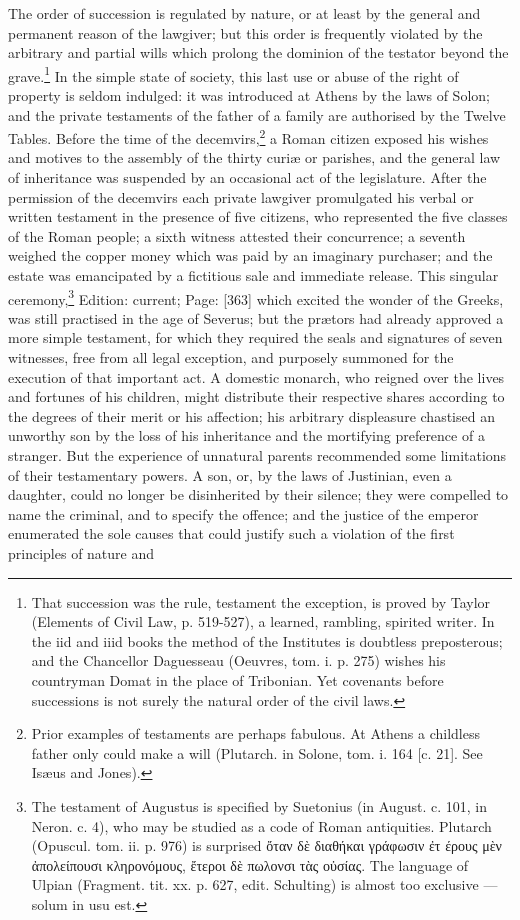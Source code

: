 The order of succession is regulated by nature, or at least by the general and permanent reason of the lawgiver; but this order is frequently violated by the arbitrary and partial wills which prolong the dominion of the testator beyond the grave.\footnote{That succession was the rule, testament the exception, is proved by Taylor (Elements of Civil Law, p. 519-527), a learned, rambling, spirited writer. In the iid and iiid books the method of the Institutes is doubtless preposterous; and the Chancellor Daguesseau (Oeuvres, tom. i. p. 275) wishes his countryman Domat in the place of Tribonian. Yet covenants before successions is not surely the natural order of the civil laws.} In the simple state of society, this last use or abuse of the right of property is seldom indulged: it was introduced at Athens by the laws of Solon; and the private testaments of the father of a family are authorised by the Twelve Tables. Before the time of the decemvirs,\footnote{Prior examples of testaments are perhaps fabulous. At Athens a childless father only could make a will (Plutarch. in Solone, tom. i. 164 [c. 21]. See Isæus and Jones).} a Roman citizen exposed his wishes and motives to the assembly of the thirty curiæ or parishes, and the general law of inheritance was suspended by an occasional act of the legislature. After the permission of the decemvirs each private lawgiver promulgated his verbal or written testament in the presence of five citizens, who represented the five classes of the Roman people; a sixth witness attested their concurrence; a seventh weighed the copper money which was paid by an imaginary purchaser; and the estate was emancipated by a fictitious sale and immediate release. This singular ceremony,\footnote{The testament of Augustus is specified by Suetonius (in August. c. 101, in Neron. c. 4), who may be studied as a code of Roman antiquities. Plutarch (Opuscul. tom. ii. p. 976) is surprised \textgreek{\texthebrew{ὄ}ταν δ\texthebrew{ὲ} διαθήκαι γράφωσιν \texthebrew{ἐ}τ έρους μ\texthebrew{ὲ}ν \texthebrew{ἀ}πολείπουσι κληρονόμους, \texthebrew{ἔ}τεροι δ\texthebrew{ὲ} πωλονσι τ\texthebrew{ὰ}ς ο\texthebrew{ὐ}σίας}. The language of Ulpian (Fragment. tit. xx. p. 627, edit. Schulting) is almost too exclusive \texthebrew{—} solum in usu est.} Edition: current; Page: [363] which excited the wonder of the Greeks, was still practised in the age of Severus; but the prætors had already approved a more simple testament, for which they required the seals and signatures of seven witnesses, free from all legal exception, and purposely summoned for the execution of that important act. A domestic monarch, who reigned over the lives and fortunes of his children, might distribute their respective shares according to the degrees of their merit or his affection; his arbitrary displeasure chastised an unworthy son by the loss of his inheritance and the mortifying preference of a stranger. But the experience of unnatural parents recommended some limitations of their testamentary powers. A son, or, by the laws of Justinian, even a daughter, could no longer be disinherited by their silence; they were compelled to name the criminal, and to specify the offence; and the justice of the emperor enumerated the sole causes that could justify such a violation of the first principles of nature and 